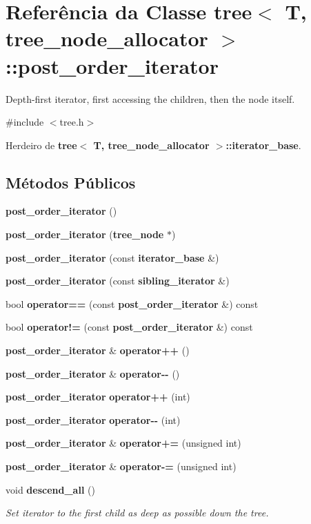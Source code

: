 \section{Referência da Classe tree$<$ T, tree\+\_\+node\+\_\+allocator $>$\+:\+:post\+\_\+order\+\_\+iterator}
\label{classtree_1_1post__order__iterator}


Depth-\/first iterator, first accessing the children, then the node itself.  




{\ttfamily \#include $<$tree.\+h$>$}



Herdeiro de {\bf tree$<$ T, tree\+\_\+node\+\_\+allocator $>$\+::iterator\+\_\+base}.

\subsection*{Métodos Públicos}
\begin{DoxyCompactItemize}
\item 
{\bf post\+\_\+order\+\_\+iterator} ()
\item 
{\bf post\+\_\+order\+\_\+iterator} ({\bf tree\+\_\+node} $\ast$)
\item 
{\bf post\+\_\+order\+\_\+iterator} (const {\bf iterator\+\_\+base} \&)
\item 
{\bf post\+\_\+order\+\_\+iterator} (const {\bf sibling\+\_\+iterator} \&)
\item 
bool {\bf operator==} (const {\bf post\+\_\+order\+\_\+iterator} \&) const 
\item 
bool {\bf operator!=} (const {\bf post\+\_\+order\+\_\+iterator} \&) const 
\item 
{\bf post\+\_\+order\+\_\+iterator} \& {\bf operator++} ()
\item 
{\bf post\+\_\+order\+\_\+iterator} \& {\bf operator-\/-\/} ()
\item 
{\bf post\+\_\+order\+\_\+iterator} {\bf operator++} (int)
\item 
{\bf post\+\_\+order\+\_\+iterator} {\bf operator-\/-\/} (int)
\item 
{\bf post\+\_\+order\+\_\+iterator} \& {\bf operator+=} (unsigned int)
\item 
{\bf post\+\_\+order\+\_\+iterator} \& {\bf operator-\/=} (unsigned int)
\item 
void {\bf descend\+\_\+all} ()
\begin{DoxyCompactList}\small\item\em Set iterator to the first child as deep as possible down the tree. \end{DoxyCompactList}\end{DoxyCompactItemize}
